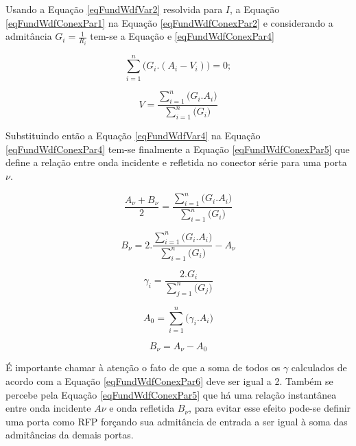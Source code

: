 	Usando a Equação \ref{eqFundWdfVar2} resolvida para $I$, a Equação \ref{eqFundWdfConexPar1} na Equação \ref{eqFundWdfConexPar2} e considerando a admitância $G_i = \frac{1}{R_i}$  tem-se a Equação e \ref{eqFundWdfConexPar4} 
	
	\begin{equation}
		\label{eqFundWdfConexPar3}
		\sum_{i=1}^{n} \big(G_i.(A_i-V_i)\big) = 0;
	\end{equation}
	
	\begin{equation}
		\label{eqFundWdfConexPar4}
		V = \frac{\sum_{i=1}^{n} \big(G_i.A_i\big)}{\sum_{i=1}^{n} \big(G_i\big)}
	\end{equation}
	
	Substituindo então a Equação \ref{eqFundWdfVar4} na Equação \ref{eqFundWdfConexPar4} tem-se finalmente a Equação \ref{eqFundWdfConexPar5} que define a relação entre onda incidente e refletida no conector série para uma porta $\nu$.
	
	\begin{equation}
		\frac{A_{\nu}+B_{\nu}}{2} = \frac{\sum_{i=1}^{n} \big(G_i.A_i\big)}{\sum_{i=1}^{n} \big(G_i\big)}
	\end{equation} 
		
	\begin{equation}
		B_{\nu} = 2.\frac{\sum_{i=1}^{n} \big(G_i.A_i\big)}{\sum_{i=1}^{n} \big(G_i\big)} - A_{\nu}
	\end{equation}
	
	\begin{equation}
		\label{eqFundWdfConexPar6}
		\gamma_i = \frac{2.G_i}{\sum_{j=1}^{n} \big(G_j\big)}
	\end{equation}
	
	\begin{equation}
		A_0 = \sum_{i=1}^{n} \big(\gamma_i.A_i\big)
	\end{equation}
	
	\begin{equation}
		\label{eqFundWdfConexPar5}
		B_{\nu} = A_{\nu} - A_0
	\end{equation}
	
	
	É importante chamar à atenção o fato de que a soma de todos os $\gamma$ calculados de acordo com a Equação \ref{eqFundWdfConexPar6} deve ser igual a 2. Também se percebe pela Equação \ref{eqFundWdfConexPar5} que há uma relação instantânea entre onda incidente $A{\nu}$ e onda refletida $B_{\nu}$, para evitar esse efeito pode-se definir uma porta como RFP forçando sua admitância de entrada a ser igual à soma das admitâncias da demais portas. 
	
